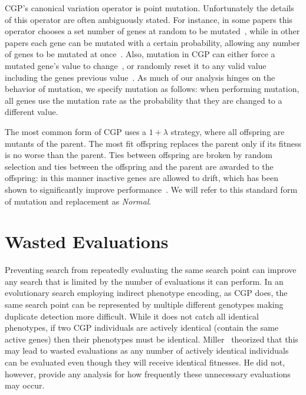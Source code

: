 \documentclass[runningheads,a4paper]{llncs}
\begin{document}
CGP's canonical variation operator is point mutation.  Unfortunately the details
of this operator are often ambiguously stated.  For instance, in some papers this
operator chooses a set number of genes at random to be mutated~\cite{miller:2011:chapter2},
while in other papers each gene can be mutated with a certain probability,
allowing any number of genes to be mutated at once~\cite{harding:2012:mtcgp}.  Also, mutation in CGP can either
force a mutated gene's value to change~\cite{harding:2012:mtcgp,miller:2011:chapter2},
or randomly reset it to any valid value including the genes previous value~\cite{miller:2006:redundancy}.
As much of our analysis hinges on
the behavior of mutation, we specify mutation as follows:
when performing mutation, all genes use the mutation rate as the
probability that they are changed to a different value.

The most common form of CGP uses a $1+\lambda$ strategy, where all offspring are
mutants of the parent.  The most fit offspring replaces the parent only if its
fitness is no worse than the parent.  Ties between offspring are broken by random selection
and ties between the offspring and the parent are awarded to the offspring:  in this manner
inactive genes are allowed to drift, which has been shown to significantly improve
performance~\cite{yu:2001:neutrality}.  We will refer to this standard form of
mutation and replacement as \emph{Normal}.

\section{Wasted Evaluations}
Preventing search from repeatedly evaluating the same search point can improve
any search that is limited by the number of evaluations it can perform.
In an evolutionary search employing indirect phenotype encoding, as CGP does,
the same search point can be represented by multiple different genotypes
making duplicate detection more difficult.  While it does not catch all
identical phenotypes, if two CGP individuals are actively identical (contain
the same active genes) then their phenotypes must be identical.
Miller~\cite{miller:2011:chapter2} theorized
that this may lead to wasted evaluations as any number of actively identical
individuals can be evaluated even though they will receive identical fitnesses.  He did not,
however, provide any analysis for how frequently these unnecessary evaluations may occur.
\end{document}
